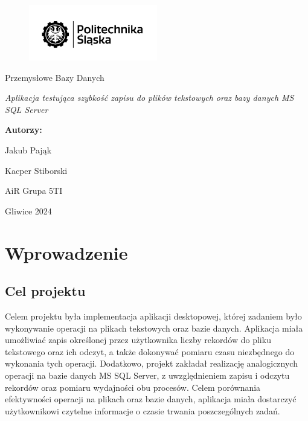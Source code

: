 \documentclass{report}
\begin{document}
\begin{titlepage}
    \centering
    \vspace*{1cm}
    \begin{figure}
        \centering 
        \includegraphics[width=0.5\textwidth]{src/logo.png}
    \end{figure}
    \Huge
    Przemysłowe Bazy Danych
    \par
    
    \vspace*{1cm}

    \vspace{0.5cm}
    \LARGE \textit{Aplikacja testująca szybkość zapisu do plików tekstowych oraz bazy danych MS SQL Server}
    
    \vspace{1.5cm}
    
    \textbf{Autorzy:} 
    \par
    Jakub Pająk
    \par
    Kacper Stiborski
    \vspace*{1.5cm}
    \par AiR Grupa 5TI
    
    \vfill
    
    \Large Gliwice 2024 

\end{titlepage}

\newpage

\tableofcontents

\newpage

\section{\LARGE Wprowadzenie}
\subsection{\Large Cel projektu}

Celem projektu była implementacja aplikacji desktopowej, której zadaniem było wykonywanie operacji na plikach tekstowych oraz bazie danych. Aplikacja miała umożliwiać zapis określonej przez użytkownika liczby rekordów do pliku tekstowego oraz ich odczyt, a także dokonywać pomiaru czasu niezbędnego do wykonania tych operacji. Dodatkowo, projekt zakładał realizację analogicznych operacji na bazie danych MS SQL Server, z uwzględnieniem zapisu i odczytu rekordów oraz pomiaru wydajności obu procesów. Celem porównania efektywności operacji na plikach oraz bazie danych, aplikacja miała dostarczyć użytkownikowi czytelne informacje o czasie trwania poszczególnych zadań.
\end{document}
